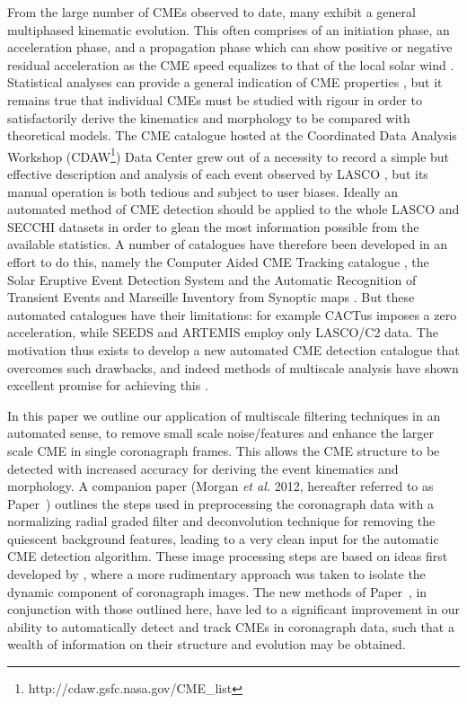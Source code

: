 \documentclass[preprint2]{aastex}
\newcommand{\RNum}[1]{\uppercase\expandafter{\romannumeral #1\relax}}
\begin{document}
From the large number of CMEs observed to date, many exhibit a general multiphased kinematic evolution. This often comprises of an initiation phase, an acceleration phase, and a propagation phase which can show positive or negative residual acceleration as the CME speed equalizes to that of the local solar wind \citep{2006ApJ...649.1100Z, 2009SoPh..256..149M}. Statistical analyses can provide a general indication of CME properties \citep[e.g.][]{2000GeoRL..27..145G, 2003AdSpR..32.2637D, 2005AnGeo..23.1033S}, but it remains true that individual CMEs must be studied with rigour in order to satisfactorily derive the kinematics and morphology to be compared with theoretical models. The CME catalogue hosted at the Coordinated Data Analysis Workshop (CDAW\footnote{http://cdaw.gsfc.nasa.gov/CME\_list}) Data Center grew out of a necessity to record a simple but effective description and analysis of each event observed by LASCO \citep{2009EM&P..104..295G}, but its manual operation is both tedious and subject to user biases. Ideally an automated method of CME detection should be applied to the whole LASCO and SECCHI datasets in order to glean the most information possible from the available statistics. A number of catalogues have therefore been developed in an effort to do this, namely the Computer Aided CME Tracking catalogue \citep[CACTus\footnote{http://sidc.oma.be/cactus/};][]{2004A&A...425.1097R}, the Solar Eruptive Event Detection System \citep[SEEDS\footnote{http://spaceweather.gmu.edu/seeds/};][]{2008SoPh..248..485O} and the Automatic Recognition of Transient Events and Marseille Inventory from Synoptic maps \citep[ARTEMIS\footnote{http://www.oamp.fr/lasco/};][]{2009SoPh..257..125B}. But these automated catalogues have their limitations: for example CACTus imposes a zero acceleration, while SEEDS and ARTEMIS employ only LASCO/C2 data. The motivation thus exists to develop a new automated CME detection catalogue that overcomes such drawbacks, and indeed methods of multiscale analysis have shown excellent promise for achieving this \citep{2009A&A...495..325B}.

In this paper we outline our application of multiscale filtering techniques in an automated sense, to remove small scale noise/features and enhance the larger scale CME in single coronagraph frames. This allows the CME structure to be detected with increased accuracy for deriving the event kinematics and morphology. A companion paper \citep{2012Paper1} (Morgan \emph{et al.} 2012, hereafter referred to as Paper~\RNum{1}) outlines the steps used in preprocessing the coronagraph data with a normalizing radial graded filter \citep[NRGF;][]{2006SoPh..236..263M} and deconvolution technique for removing the quiescent background features, leading to a very clean input for the automatic CME detection algorithm. These image processing steps are based on ideas first developed by \citet{2010ApJ...711..631M}, where a more rudimentary approach was taken to isolate the dynamic component of coronagraph images. The new methods of Paper~\RNum{1}, in conjunction with those outlined here, have led to a significant improvement in our ability to automatically detect and track CMEs in coronagraph data, such that a wealth of information on their structure and evolution may be obtained.
\end{document}

